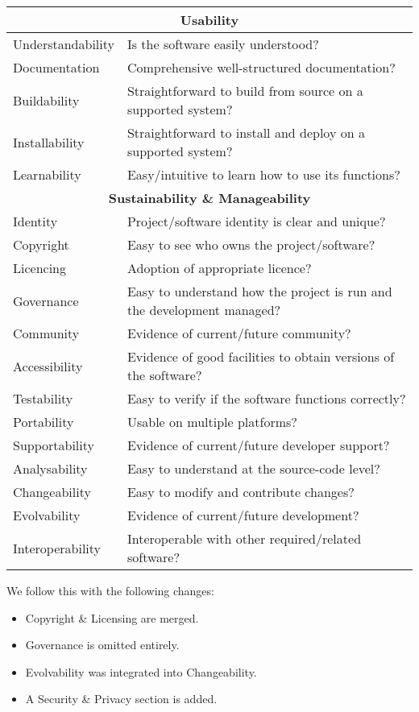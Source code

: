 \documentclass[a4paper,11pt]{article}
\begin{document}
\begin{tabular}{l|l}
\hline
\multicolumn{2}{c}{\textbf{Usability}} \\
\hline
Understandability & Is the software easily understood? \\ 
Documentation & Comprehensive well-structured documentation? \\
Buildability  & Straightforward to build from source on a supported system? \\
Installability  & Straightforward to install and deploy on a supported system? \\
Learnability & Easy/intuitive to learn how to use its functions? \\
\hline
\multicolumn{2}{c}{\textbf{Sustainability \& Manageability}} \\
\hline
Identity & Project/software identity is clear and unique? \\
Copyright & Easy to see who owns the project/software? \\
Licencing & Adoption of appropriate licence? \\
Governance & Easy to understand how the project is run and the development managed? \\
Community & Evidence of current/future community? \\
Accessibility & Evidence of good facilities to obtain versions of the software? \\
Testability & Easy to verify if the software functions correctly? \\
Portability & Usable on multiple platforms? \\
Supportability & Evidence of current/future developer support? \\
Analysability & Easy to understand at the source-code level? \\
Changeability & Easy to modify and contribute changes? \\
Evolvability & Evidence of current/future development? \\
Interoperability & Interoperable with other required/related software? \\
\end{tabular}

We follow this with the following changes:

\begin{itemize}
\item Copyright \& Licensing are merged.
\item Governance is omitted entirely.
\item Evolvability was integrated into Changeability.
\item A Security \& Privacy section is added.
\end{itemize}
\end{document}
